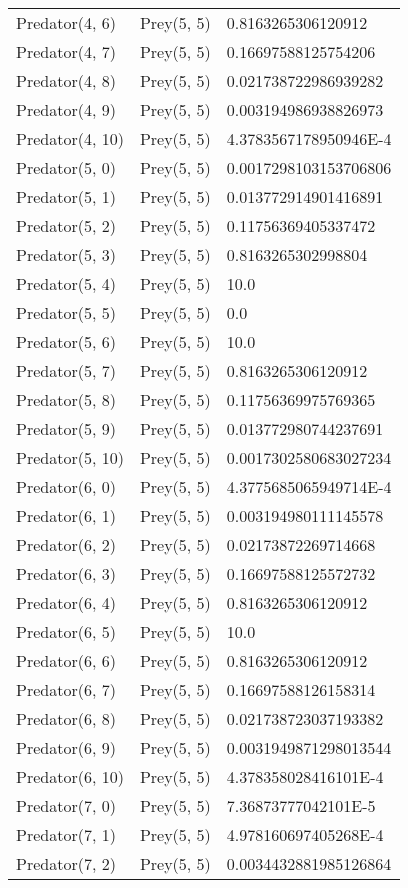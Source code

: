 \begin{longtable}{| p{} | p{} | p{} |}
Predator(4, 6) & Prey(5, 5) &0.8163265306120912\\
Predator(4, 7) & Prey(5, 5) &0.16697588125754206\\
Predator(4, 8) & Prey(5, 5) &0.021738722986939282\\
Predator(4, 9) & Prey(5, 5) &0.003194986938826973\\
Predator(4, 10) & Prey(5, 5) &4.3783567178950946E-4\\
Predator(5, 0) & Prey(5, 5) &0.0017298103153706806\\
Predator(5, 1) & Prey(5, 5) &0.013772914901416891\\
Predator(5, 2) & Prey(5, 5) &0.11756369405337472\\
Predator(5, 3) & Prey(5, 5) &0.8163265302998804\\
Predator(5, 4) & Prey(5, 5) &10.0\\
Predator(5, 5) & Prey(5, 5) &0.0\\
Predator(5, 6) & Prey(5, 5) &10.0\\
Predator(5, 7) & Prey(5, 5) &0.8163265306120912\\
Predator(5, 8) & Prey(5, 5) &0.11756369975769365\\
Predator(5, 9) & Prey(5, 5) &0.013772980744237691\\
Predator(5, 10) & Prey(5, 5) &0.0017302580683027234\\
Predator(6, 0) & Prey(5, 5) &4.3775685065949714E-4\\
Predator(6, 1) & Prey(5, 5) &0.003194980111145578\\
Predator(6, 2) & Prey(5, 5) &0.02173872269714668\\
Predator(6, 3) & Prey(5, 5) &0.16697588125572732\\
Predator(6, 4) & Prey(5, 5) &0.8163265306120912\\
Predator(6, 5) & Prey(5, 5) &10.0\\
Predator(6, 6) & Prey(5, 5) &0.8163265306120912\\
Predator(6, 7) & Prey(5, 5) &0.16697588126158314\\
Predator(6, 8) & Prey(5, 5) &0.021738723037193382\\
Predator(6, 9) & Prey(5, 5) &0.0031949871298013544\\
Predator(6, 10) & Prey(5, 5) &4.378358028416101E-4\\
Predator(7, 0) & Prey(5, 5) &7.36873777042101E-5\\
Predator(7, 1) & Prey(5, 5) &4.978160697405268E-4\\
Predator(7, 2) & Prey(5, 5) &0.0034432881985126864\\

\end{longtable}
